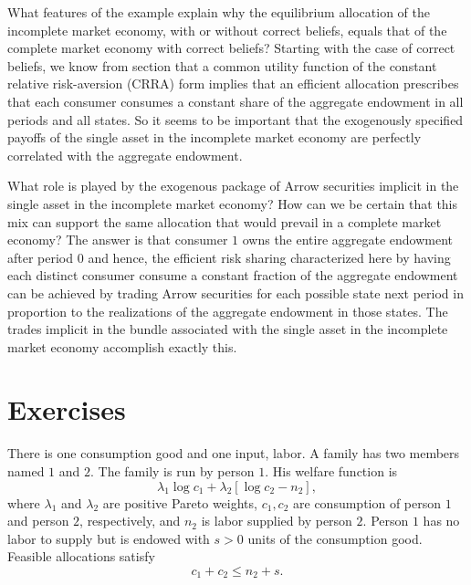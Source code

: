 What features of the example explain why the equilibrium
allocation of the incomplete market economy, with or without
correct beliefs, equals that of the complete market economy
with correct beliefs? Starting with the case of correct beliefs, we
know from section 
that  a common utility
function of the constant relative risk-aversion (CRRA) form
implies that an efficient allocation prescribes that each
 consumer consumes a constant share of the aggregate endowment
in all periods and all states. So it seems to be important
that the exogenously specified payoffs of the single asset in the
incomplete market economy are perfectly correlated with the
aggregate endowment.

What  role is played by the exogenous package  of
Arrow securities implicit in the single asset in the
incomplete market economy?  How can we be certain that this mix
can support the same  allocation that would prevail in  a complete
market economy? The answer is that consumer $1$ owns the entire
aggregate endowment after period $0$ and hence, the efficient
risk sharing  characterized here by having each distinct consumer
consume a constant fraction of the aggregate endowment can be achieved
by trading Arrow securities for each possible
state next period in proportion to the realizations of the
aggregate endowment in those states.  The  trades implicit in
  the  bundle
associated with the single asset in the incomplete market economy accomplish exactly this.



























\showchaptIDfalse \showsectIDfalse
\section{Exercises}
\showchaptIDtrue \showsectIDtrue
\medskip
\medskip

 
\medskip
\noindent There is one consumption good and one input, labor.
 A family has two members named $1$ and $2$.  The family is run by person $1$.  His welfare function
is
$$ \lambda_1 \log c_1 + \lambda_2  [\log c_2 - n_2 ] , $$
where $\lambda_1$ and $\lambda_2$ are positive Pareto weights,  $c_1, c_2$ are  consumption of  person $1$ and person $2$, respectively, and $n_2$ is labor supplied by person $2$. Person $1$ has no  labor to supply  but is endowed
with $s > 0$ units of the consumption good.  Feasible allocations satisfy
$$ c_1 + c_2 \leq n_2 + s .$$


